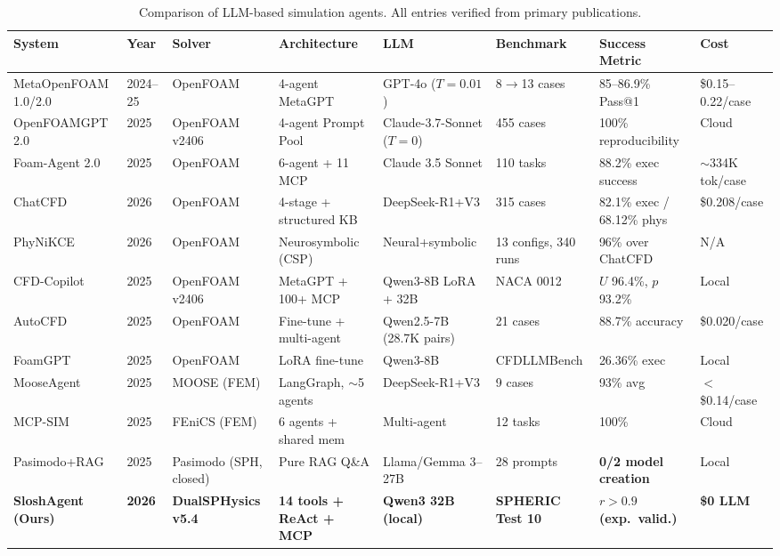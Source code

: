 \documentclass[11pt]{article}
\begin{document}
\begin{table}[t]
\centering
\caption{Comparison of LLM-based simulation agents. All entries verified from primary publications.}
\label{tab:comparison}
\footnotesize
\begin{tabular}{@{}llllllll@{}}
\toprule
\textbf{System} & \textbf{Year} & \textbf{Solver} & \textbf{Architecture} & \textbf{LLM} & \textbf{Benchmark} & \textbf{Success Metric} & \textbf{Cost} \\
\midrule
MetaOpenFOAM 1.0/2.0 & 2024--25 & OpenFOAM & 4-agent MetaGPT & GPT-4o ($T{=}0.01$) & 8$\to$13 cases & 85--86.9\% Pass@1 & \$0.15--0.22/case \\
OpenFOAMGPT 2.0 & 2025 & OpenFOAM v2406 & 4-agent Prompt Pool & Claude-3.7-Sonnet ($T{=}0$) & 455 cases & 100\% reproducibility & Cloud \\
Foam-Agent 2.0 & 2025 & OpenFOAM & 6-agent + 11 MCP & Claude 3.5 Sonnet & 110 tasks & 88.2\% exec success & {$\sim$}334K tok/case \\
ChatCFD & 2026 & OpenFOAM & 4-stage + structured KB & DeepSeek-R1+V3 & 315 cases & 82.1\% exec / 68.12\% phys & \$0.208/case \\
PhyNiKCE & 2026 & OpenFOAM & Neurosymbolic (CSP) & Neural+symbolic & 13 configs, 340 runs & 96\% over ChatCFD & N/A \\
CFD-Copilot & 2025 & OpenFOAM v2406 & MetaGPT + 100+ MCP & Qwen3-8B LoRA + 32B & NACA 0012 & $U$ 96.4\%, $p$ 93.2\% & Local \\
AutoCFD & 2025 & OpenFOAM & Fine-tune + multi-agent & Qwen2.5-7B (28.7K pairs) & 21 cases & 88.7\% accuracy & \$0.020/case \\
FoamGPT & 2025 & OpenFOAM & LoRA fine-tune & Qwen3-8B & CFDLLMBench & 26.36\% exec & Local \\
MooseAgent & 2025 & MOOSE (FEM) & LangGraph, {$\sim$}5 agents & DeepSeek-R1+V3 & 9 cases & 93\% avg & $<$\$0.14/case \\
MCP-SIM & 2025 & FEniCS (FEM) & 6 agents + shared mem & Multi-agent & 12 tasks & 100\% & Cloud \\
Pasimodo+RAG & 2025 & Pasimodo (SPH, closed) & Pure RAG Q\&A & Llama/Gemma 3--27B & 28 prompts & \textbf{0/2 model creation} & Local \\
\midrule
\textbf{SloshAgent (Ours)} & \textbf{2026} & \textbf{DualSPHysics v5.4} & \textbf{14 tools + ReAct + MCP} & \textbf{Qwen3 32B (local)} & \textbf{SPHERIC Test 10} & \textbf{$r{>}0.9$ (exp.\ valid.)} & \textbf{\$0 LLM} \\
\bottomrule
\end{tabular}
\end{table}
\end{document}
